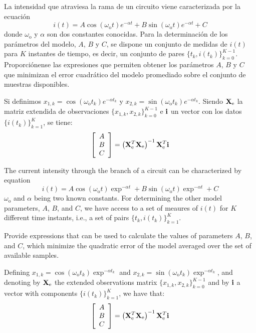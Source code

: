 \ifspanish

\question La intensidad que atraviesa la rama de un circuito viene caracterizada por la ecuación
$$i(t) = A \cos(\omega_\text{o}t) {e^{-\alpha t}} + B \sin(\omega_\text{o}t) {e^{-\alpha t}} + C $$
donde $\omega_\text{o}$ y $\alpha$ son dos constantes conocidas.  Para la determinación de los parámetros del modelo, $A$, $B$ y $C$, se dispone un conjunto de medidas
de $i(t)$ para $K$ instantes de tiempo, es decir, un conjunto de pares $\{t_k, i(t_k)\}_{k=0}^{K-1}$.    
Proporciónense las expresiones que permiten obtener los parámetros $A$, $B$ y $C$ que minimizan el error cuadrático del modelo promediado sobre el conjunto de muestras disponibles.

\begin{solution}
Si definimos $x_{1,k} = \cos(\omega_\text{o} t_k) {e^{-\alpha t_k}}$ y  $x_{2,k} = \sin(\omega_\text{o} t_k) {e^{-\alpha t_k}}$. Siendo ${\bf X}_\text{e}$  la matriz
extendida de observaciones $\{x_{1,k},x_{2,k}\}_{k=0}^{K-1}$ e $\bf i$ un vector con los datos $\{i(t_k)\}_{k=1}^K$, se tiene:
$$ \left[ \begin{array}{c} A \\ B \\ C \end{array}\right] = \left( {\bf X}_\text{e}^T {\bf X}_\text{e}\right)^{-1} {\bf X}_\text{e}^T {\bf i}$$ 
\end{solution}

\else

\question The current intensity through the branch of a circuit can be characterized by equation
$$i(t) = A \cos(\omega_\text{o}t) \exp^{-\alpha t} + B \sin(\omega_\text{o}t) \exp^{-\alpha t} + C $$
$\omega_\text{o}$ and $\alpha$ being two known constants.  For determining the other model parameters, $A$, $B$, and $C$, we have access to a set of meaures of $i(t)$ for $K$ different time instants, i.e., a set of pairs $\{t_k, i(t_k)\}_{k=1}^K$.    

Provide expressions that can be used to calculate the values of parameters $A$, $B$, and $C$, which minimize the quadratic error of the model averaged over the set of available samples.

\begin{solution}
Defining $x_{1,k} = \cos(\omega_\text{o} t_k) \exp^{-\alpha t_k}$ and $x_{2,k} = \sin(\omega_\text{o} t_k) \exp^{-\alpha t_k}$, and denoting by ${\bf X}_\text{e}$ the extended observations matrix $\{x_{1,k},x_{2,k}\}_{k=0}^{K-1}$ and by $\bf i$ a vector with components $\{i(t_k)\}_{k=1}^K$, we have that:
$$ \left[ \begin{array}{c} A \\ B \\ C \end{array}\right] = \left( {\bf X}_\text{e}^T {\bf X}_\text{e}\right)^{-1} {\bf X}_\text{e}^T {\bf i}$$ 
\end{solution}

\fi